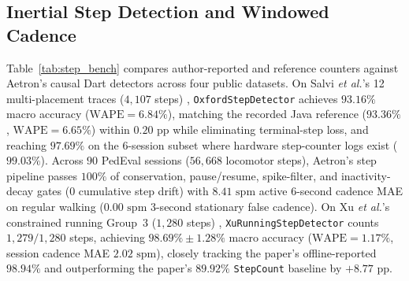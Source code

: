 \documentclass[journal]{IEEEtran}
\begin{document}
\begin{table}[t]
\centering
\caption{Stop/Motion Classification on STAGA Trajectory Diary ($N = 122{,}808$ Epochs, $\Delta t_{\text{med}} = 10.0\text{ s}$)}
\label{tab:staga_bench}
\renewcommand{\arraystretch}{1.15}
\end{table}

\subsection{Inertial Step Detection and Windowed Cadence}
Table~\ref{tab:step_bench} compares author-reported and reference counters against Aetron's causal Dart detectors across four public datasets. On Salvi \emph{et al.}'s 12 multi-placement traces ($4{,}107$ steps) \cite{salvi2018oxford}, \texttt{OxfordStepDetector} achieves $93.16\%$ macro accuracy ($\mathrm{WAPE} = 6.84\%$), matching the recorded Java reference ($93.36\%$, $\mathrm{WAPE} = 6.65\%$) within $0.20\text{ pp}$ while eliminating terminal-step loss, and reaching $97.69\%$ on the 6-session subset where hardware step-counter logs exist ($99.03\%$). Across $90$ PedEval sessions ($56{,}668$ locomotor steps), Aetron's step pipeline passes $100\%$ of conservation, pause/resume, spike-filter, and inactivity-decay gates ($0$ cumulative step drift) with $8.41\text{ spm}$ active 6-second cadence MAE on regular walking ($0.00\text{ spm}$ 3-second stationary false cadence). On Xu \emph{et al.}'s constrained running Group~3 ($1{,}280$ steps) \cite{xu2022step}, \texttt{XuRunningStepDetector} counts $1{,}279/1{,}280$ steps, achieving $\mathbf{98.69\% \pm 1.28\%}$ macro accuracy ($\mathrm{WAPE} = 1.17\%$, session cadence MAE $2.02\text{ spm}$), closely tracking the paper's offline-reported $98.94\%$ and outperforming the paper's $89.92\%$ \texttt{StepCount} baseline by $+8.77\text{ pp}$.
\end{document}
